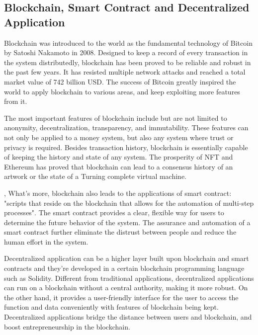 \documentclass{article}
\begin{document}
\subsection{Blockchain, Smart Contract and Decentralized Application}
\par Blockchain was introduced to the world as the fundamental technology of Bitcoin by Satoshi Nakamoto in 2008\cite{Bitcoin}. Designed to keep a record of every transaction in the system distributedly, blockchain has been proved to be reliable and robust in the past few years. It has resisted multiple network attacks and reached a total market value of 742 billion USD. The success of Bitcoin greatly inspired the world to apply blockchain to various areas, and keep exploiting more features from it.
\par The most important features of blockchain include but are not limited to anonymity, decentralization, transparency, and immutability. These features can not only be applied to a money system, but also any system where trust or privacy is required. Besides transaction history, blockchain is essentially capable of keeping the history and state of any system. The prosperity of NFT and Ethereum has proved that blockchain can lead to a consensus history of an artwork or the state of a Turning complete virtual machine.
\par, What's more, blockchain also leads to the applications of smart contract: "scripts that reside on the blockchain that allows for the automation of multi-step processes"\cite{SmartContract}. The smart contract provides a clear, flexible way for users to determine the future behavior of the system. The assurance and automation of a smart contract further eliminate the distrust between people and reduce the human effort in the system.
\par Decentralized application can be a higher layer built upon blockchain and smart contracts and they're developed in a certain blockchain programming language such as Solidity. Different from traditional applications, decentralized applications can run on a blockchain without a central authority, making it more robust. On the other hand, it provides a user-friendly interface for the user to access the function and data conveniently with features of blockchain being kept. Decentralized applications bridge the distance between users and blockchain, and boost entrepreneurship in the blockchain.
\end{document}
